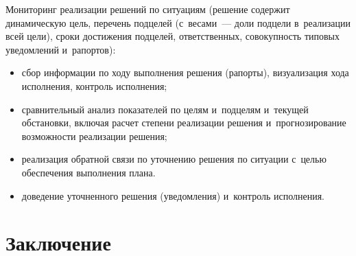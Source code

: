 \begin{multicols}{2}
    Мониторинг реализации решений по ситуациям (решение содержит 
динамическую цель, перечень подцелей (с~весами~--- доли подцели 
в~реализации всей цели), сроки достижения подцелей, ответственных, 
совокупность типовых уведомлений и~рапортов): 
    \begin{itemize}
\item сбор информации по ходу выполнения решения (рапорты), 
визуализация хода исполнения, контроль исполнения;
\item сравнительный анализ показателей по целям и~подцелям и~текущей 
обстановки, включая расчет степени реализации решения и~прогнозирование 
возможности реализации решения;
\item реализация обратной связи по уточнению решения по ситуации с~целью 
обеспечения выполнения плана.
\item доведение уточненного решения (уведомления) и~контроль исполнения.
\end{itemize}

\vspace*{-6pt}

\section{Заключение}


\end{multicols}
